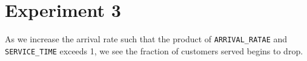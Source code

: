 \section*{Experiment 3}
As we increase the arrival rate such that the product of \texttt{ARRIVAL\_RATAE} and \texttt{SERVICE\_TIME} exceeds 1, we see the fraction of customers served begins to drop.